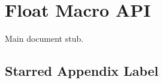 \documentclass[a4paper,12pt]{report}
\begin{document}
\chapter{Float Macro API}
Main document stub.
\appendixChapter
\section{Starred Appendix Label}
\end{document}
